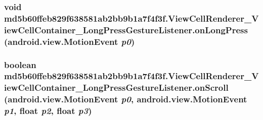 \hypertarget{classmd5b60ffeb829f638581ab2bb9b1a7f4f3f_1_1_view_cell_renderer___view_cell_container___long_press_gesture_listener_57d6c39446287cb3e46f86c3aabfd891}{
\subsubsection[{onLongPress}]{\setlength{\rightskip}{0pt plus 5cm}void md5b60ffeb829f638581ab2bb9b1a7f4f3f.ViewCellRenderer\_\-ViewCellContainer\_\-LongPressGestureListener.onLongPress (android.view.MotionEvent {\em p0})}}
\label{classmd5b60ffeb829f638581ab2bb9b1a7f4f3f_1_1_view_cell_renderer___view_cell_container___long_press_gesture_listener_57d6c39446287cb3e46f86c3aabfd891}


\hypertarget{classmd5b60ffeb829f638581ab2bb9b1a7f4f3f_1_1_view_cell_renderer___view_cell_container___long_press_gesture_listener_9038fcf1e8bddceea09511cb092fb088}{
\subsubsection[{onScroll}]{\setlength{\rightskip}{0pt plus 5cm}boolean md5b60ffeb829f638581ab2bb9b1a7f4f3f.ViewCellRenderer\_\-ViewCellContainer\_\-LongPressGestureListener.onScroll (android.view.MotionEvent {\em p0}, \/  android.view.MotionEvent {\em p1}, \/  float {\em p2}, \/  float {\em p3})}}
\label{classmd5b60ffeb829f638581ab2bb9b1a7f4f3f_1_1_view_cell_renderer___view_cell_container___long_press_gesture_listener_9038fcf1e8bddceea09511cb092fb088}


